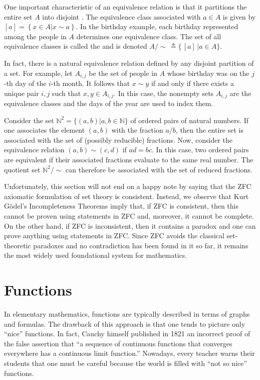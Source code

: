 One important characteristic of an equivalence relation is that it partitions the entire set $A$ into disjoint .
The equivalence class associated with $a\in A$ is given by  $[a] = \left\{x\in A | x \sim a\right\}$.
In the birthday example, each birthday represented among the people in $A$ determines one equivalence class.
The set of all equivalence classes is called the  and is denoted $A / \!\! \sim \, \triangleq \{ \,[a]\, | a\in A \}$.

In fact, there is a natural equivalence relation defined by any disjoint partition of a set.
For example, let $A_{i,j}$ be the set of people in $A$ whose birthday was on the $j$-th day of the $i$-th month.
It follows that $x\sim y$ if and only if there exists a unique pair $i,j$ such that $x,y \in A_{i,j}$.
In this case, the nonempty sets $A_{i,j}$ are the equivalence classes and the days of the year are used to index them.

\begin{example}
Consider the set $\mathbb{N}^2 = \{ (a,b) | a,b\in\mathbb{N} \}$ of ordered pairs of natural numbers.
If one associates the element $(a,b)$ with the fraction $a/b$, then the entire set is associated with the set of (possibly reducible) fractions.
Now, consider the equivalence relation $(a,b) \sim (c,d)$ if $ad=bc$.
In this case, two ordered pairs are equivalent if their associated fractions evaluate to the same real number.
The quotient set $\mathbb{N}^2 / \!\! \sim$ can therefore be associated with the set of reduced fractions.
\end{example}

Unfortunately, this section will not end on a happy note by saying that the ZFC axiomatic formulation of set theory is consistent.
Instead, we observe that Kurt G\"{o}del's Incompleteness Theorems imply that, if ZFC is consistent, then this cannot be proven using statements in ZFC and, moreover, it cannot be complete.
On the other hand, if ZFC is inconsistent, then it contains a paradox and one can prove anything using statements in ZFC.
Since ZFC avoids the classical set-theoretic paradoxes and no contradiction has been found in it so far, it remains the most widely used foundational system for mathematics.


\section{Functions}

In elementary mathematics, functions are typically described in terms of graphs and formulas.
The drawback of this approach is that one tends to picture only ``nice'' functions.
In fact, Cauchy himself published in 1821 an incorrect proof of the false assertion that ``a sequence of continuous functions that converges everywhere has a continuous limit function.''
Nowadays, every teacher warns their students that one must be careful because the world is filled with ``not so nice'' functions.

